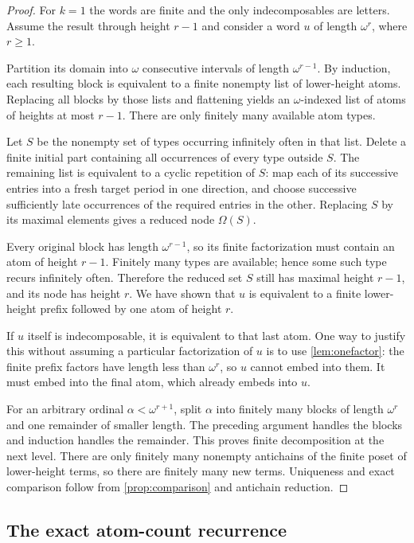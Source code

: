 \documentclass[11pt,letterpaper]{article}
\theoremstyle{definition}
\theoremstyle{remark}
\begin{document}
\begin{proof}
For $k=1$ the words are finite and the only indecomposables are letters.
Assume the result through height $r-1$ and consider a word $u$ of length
$\omega^r$, where $r\ge1$.

Partition its domain into $\omega$ consecutive intervals of length
$\omega^{r-1}$. By induction, each resulting block is equivalent to a
finite nonempty list of lower-height atoms. Replacing all blocks by those
lists and flattening yields an $\omega$-indexed list of atoms of heights
at most $r-1$. There are only finitely many available atom types.

Let $S$ be the nonempty set of types occurring infinitely often in that
list. Delete a finite initial part containing all occurrences of every
type outside $S$. The remaining list is equivalent to a cyclic repetition
of $S$: map each of its successive entries into a fresh target period in
one direction, and choose successive sufficiently late occurrences of the
required entries in the other. Replacing $S$ by its maximal elements
gives a reduced node $\Omega(S)$.

Every original block has length $\omega^{r-1}$, so its finite factorization
must contain an atom of height $r-1$. Finitely many types are available;
hence some such type recurs infinitely often. Therefore the reduced set
$S$ still has maximal height $r-1$, and its node has height $r$.
We have shown that $u$ is equivalent to a finite lower-height prefix
followed by one atom of height $r$.

If $u$ itself is indecomposable, it is equivalent to that last atom.
One way to justify this without assuming a particular factorization of
$u$ is to use \cref{lem:onefactor}: the finite prefix factors have length
less than $\omega^r$, so $u$ cannot embed into them. It must embed into
the final atom, which already embeds into $u$.

For an arbitrary ordinal $\alpha<\omega^{r+1}$, split $\alpha$ into finitely
many blocks of length $\omega^r$ and one remainder of smaller length.
The preceding argument handles the blocks and induction handles the
remainder. This proves finite decomposition at the next level.
There are only finitely many nonempty antichains of the finite poset of
lower-height terms, so there are finitely many new terms. Uniqueness and
exact comparison follow from \cref{prop:comparison} and antichain reduction.
\end{proof}

\subsection{The exact atom-count recurrence}
\end{document}
